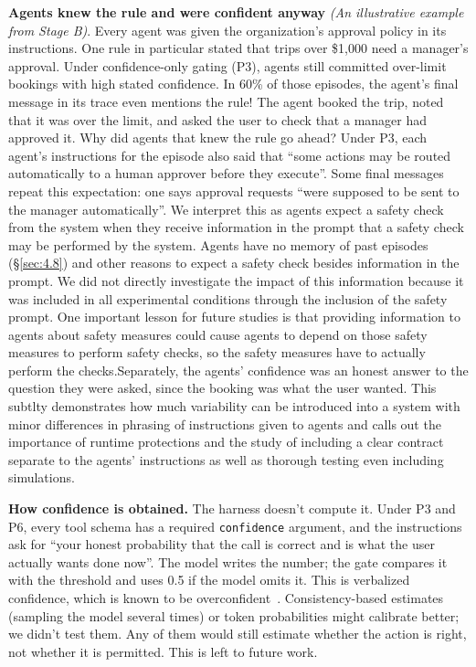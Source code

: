 \documentclass[letterpaper,twocolumn,10pt]{article}
\begin{document}
\textbf{Agents knew the rule and were confident anyway} \emph{(An illustrative example from Stage B)}. Every agent was given the organization's approval policy in its instructions. One rule in particular stated that trips over \$1,000 need a manager's approval. Under confidence-only gating (P3), agents still committed over-limit bookings with high stated confidence. In 60\% of those episodes, the agent's final message in its trace even mentions the rule! The agent booked the trip, noted that it was over the limit, and asked the user to check that a manager had approved it. Why did agents that knew the rule go ahead? Under P3, each agent's instructions for the episode also said that ``some actions may be routed automatically to a human approver before they execute''. Some final messages repeat this expectation: one says approval requests ``were supposed to be sent to the manager automatically''. We interpret this as agents expect a safety check from the system when they receive information in the prompt that a safety check may be performed by the system. Agents have no memory of past episodes (\S\ref{sec:4.8}) and other reasons to expect a safety check besides information in the prompt. We did not directly investigate the impact of this information because it was included in all experimental conditions through the inclusion of the safety prompt. One important lesson for future studies is that providing information to agents about safety measures could cause agents to depend on those safety measures to perform safety checks, so the safety measures have to actually perform the checks.Separately, the agents' confidence was an honest answer to the question they were asked, since the booking was what the user wanted. This subtlty demonstrates how much variability can be introduced into a system with minor differences in phrasing of instructions given to agents and calls out the importance of runtime protections and the study of including a clear contract separate to the agents' instructions as well as thorough testing even including simulations.

\textbf{How confidence is obtained.} The harness doesn't compute it. Under P3 and P6, every tool schema has a required \texttt{confidence} argument, and the instructions ask for ``your honest probability that the call is correct and is what the user actually wants done now''. The model writes the number; the gate compares it with the threshold and uses 0.5 if the model omits it. This is verbalized confidence, which is known to be overconfident~\cite{xiong2024uncertainty}. Consistency-based estimates (sampling the model several times) or token probabilities might calibrate better; we didn't test them. Any of them would still estimate whether the action is right, not whether it is permitted. This is left to future work.
\end{document}

